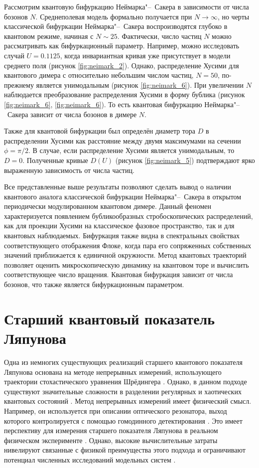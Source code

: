 Рассмотрим квантовую бифуркацию Неймарка"--~Сакера в зависимости от числа бозонов $N$.
Среднеполевая модель формально получается при $N \to \infty$, но черты классической бифуркации Неймарка"--~Сакера воспроизводятся глубоко в квантовом режиме, начиная с $N \sim 25$.
Фактически, число частиц $N$ можно рассматривать как бифуркационный параметр.
Например, можно исследовать случай $U=0.1125$, когда инвариантная кривая уже присутствует в модели среднего поля (рисунок \cref{fig:neimark_2}). 
Однако, распределение Хусими для квантового димера с относительно небольшим числом частиц, $N=50 $, по-прежнему является унимодальным (рисунок \cref{fig:neimark_6}).
При увеличении $N$ наблюдается преобразование распределения Хусими в форму бублика (рисунок \cref{fig:neimark_6}, \cref{fig:neimark_6}).
То есть квантовая бифуркацию Неймарка"--~Сакера зависит от числа бозонов в димере $N$.

Также для квантовой бифуркации был определён диаметр тора $D$ в распределении Хусими как расстояние между двумя максимумами на сечении $\phi = \pi / 2$.
В случае, если распределение Хусими является унимодальным, то $D = 0$. 
Полученные кривые $D(U)$ (рисунок \cref{fig:neimark_5}) подтверждают ярко выраженную зависимость от числа частиц.

Все представленные выше результаты позволяют сделать вывод о наличии квантового аналога классической бифуркации Неймарка"--~Сакера в открытом периодически модулированном квантовом димере.
Данный феномен характеризуется появлением бубликообразных стробоскопических распределений, как для проекции Хусими на классическое фазовое пространство, так и для квантовых наблюдаемых.
Бифуркация также видна в спектральных свойствах соответствующего отображения Флоке, когда пара его сопряженных собственных значений приближается к единичной окружности.
Метод квантовых траекторий позволяет оценить микроскопическую динамику на квантовом торе и вычислить соответствующее число вращения.
Квантовая бифуркация зависит от числа бозонов, что также является бифуркационным параметром.

\section{Старший квантовый показатель Ляпунова}\label{sec:ch3/le}

Одна из немногих существующих реализаций старшего квантового показателя Ляпунова основана на методе непрерывных измерений, использующего траектории стохастического уравнения Шрёдингера \cite{Gisin1992}. 
Однако, в данном подходе существуют значительные сложности в разделении регулярных и хаотических квантовых состояний \cite{Ota2005, Kapulkin2008}. 
Метод непрерывных измерений имеет физический смысл.
Например, он используется при описании оптического резонатора, выход которого контролируется с помощью гомодинного детектирования \cite{Carmichael1993,Wiseman1993}. 
Это имеет перспективу для измерения старшего показателя Ляпунова в реальном физическом эксперименте \cite{Eastman2017}. 
Однако, высокие вычислительные затраты нивелируют связанные с физикой преимущества этого подхода и ограничивают потенциал численных исследований модельных систем \cite{Pokharel2018}.

